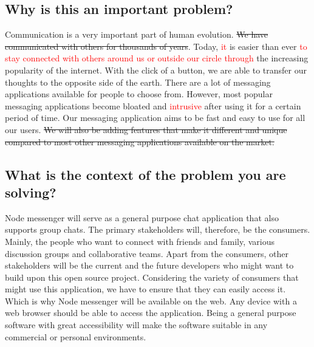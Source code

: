 \documentclass{article}
\begin{document}
	\subsection{Why is this an important problem?}
    Communication is a very important part of human evolution. \sout{We have communicated with others for thousands of years}. Today, \textcolor{red}{it} is easier than ever \textcolor{red}{to stay connected with others around us or outside our circle} \textcolor{red}{through} the increasing popularity of the internet. With the click of a button, we are able to transfer our thoughts to the opposite side of the earth. There are a lot of messaging applications available for people to choose from. However, most popular messaging applications become bloated and \textcolor{red}{intrusive} after using it for a certain period of time. Our messaging application aims to be fast and easy to use for all our users. \sout{We will also be adding features that make it different and unique compared to most other messaging applications available on the market.}
      
	\subsection{What is the context of the problem you are solving?}   
Node messenger will serve as a general purpose chat application that also supports group chats. The primary stakeholders will, therefore, be the consumers. Mainly, the people who want to connect with friends and family, various discussion groups and collaborative teams. Apart from the consumers, other stakeholders will be the current and the future developers who might want to build upon this open source project. Considering the variety of consumers that might use this application, we have to ensure that they can easily access it. Which is why Node messenger will be available on the web. Any device with a web browser should be able to access the application. Being a general purpose software with great accessibility will make the software suitable in any commercial or personal environments.
\end{document}
